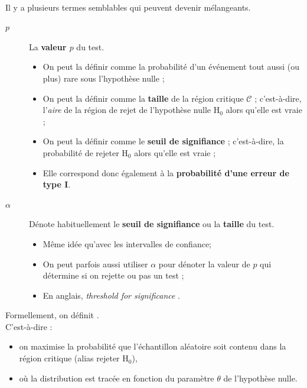 \documentclass[10pt, french]{article}
\begin{document}
\begin{multicols*}{2}
\

Il y a plusieurs termes semblables qui peuvent devenir mélangeants.
\begin{distributions}[Terminologie]
\begin{description}
	\item[$p$]	La \textbf{valeur $p$} du test.
		\begin{itemize}
		\item	On peut la définir comme la probabilité d'un événement tout aussi (ou plus) rare sous l'hypothèse nulle ;
		\item	On peut la définir comme la \textbf{taille} de la région critique $\mathcal{C}$ ; c'est-à-dire, l'\textit{aire} de la région de rejet de l'hypothèse nulle $\text{H}_{0}$ alors qu'elle est vraie ;
		\item	On peut la définir comme le \textbf{seuil de signifiance} ; c'est-à-dire, la probabilité de rejeter $\text{H}_{0}$ alors qu'elle est vraie ;
		\item	Elle correspond donc également à la \textbf{probabilité d'une erreur de type I}.
		\end{itemize}
	\item[$\alpha$]	Dénote habituellement le \textbf{seuil de signifiance} ou la \textbf{taille} du test.
		\begin{itemize}
		\item	Même idée qu'avec les intervalles de confiance;
		\item	On peut parfois aussi utiliser $\alpha$ pour dénoter la valeur de $p$ qui détermine si on rejette ou pas un test ;
		\item	En anglais, \og \textit{threshold for significance} \fg{}.
		\end{itemize}
\end{description}
\end{distributions}

Formellement, on définit . \\
C'est-à-dire :
\begin{itemize}
	\item	on \textcolor{indigo(web)}{maximise} la probabilité que \textcolor{bondiblue!80!black}{l'échantillon aléatoire} soit \textcolor{armygreen}{contenu} dans \textcolor{bulgarianrose!90!black}{la région critique} (alias rejeter $\textrm{H}_{0}$), 
	\item	où la distribution est tracée \textcolor{amethyst}{en fonction du paramètre $\theta$} de \textcolor{pastelred}{l'hypothèse nulle}.
\end{itemize}



\end{multicols*}
\end{document}
